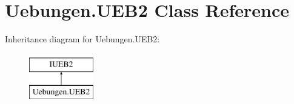 \hypertarget{class_uebungen_1_1_u_e_b2}{}\section{Uebungen.\+U\+E\+B2 Class Reference}
\label{class_uebungen_1_1_u_e_b2}
Inheritance diagram for Uebungen.\+U\+E\+B2\+:\begin{figure}[H]
\begin{center}
\leavevmode
\includegraphics[height=2.000000cm]{class_uebungen_1_1_u_e_b2}
\end{center}
\end{figure}
